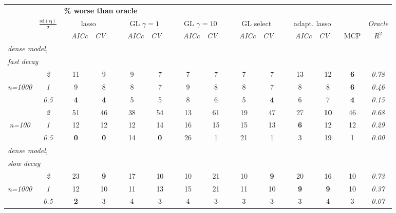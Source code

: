 \documentclass[12pt]{article}
\begin{document}
\begin{table}
\footnotesize
\begin{center}
\begin{tabular}{cc|cc|cc|cc|cc|cc|c|c}
& & \multicolumn{11}{l|}{\bf \% worse than oracle } & \\[1ex]
& \multirow{2}{*}{$\displaystyle\frac{\mathrm{sd}(\boldsymbol{\eta})}{\sigma}$} 
& \multicolumn{2}{c}{lasso} 
& \multicolumn{2}{c}{GL $\gamma=1$} 
& \multicolumn{2}{c}{GL $\gamma=10$} 
& \multicolumn{2}{c}{GL select} 
& \multicolumn{2}{c}{ adapt. lasso} 
& \multicolumn{1}{c|}{~} & \it Oracle \\[-0.5ex]
& 
& ~~\scriptsize\it AICc & \multicolumn{1}{c}{\scriptsize\it CV~~}
& ~~\scriptsize\it AICc & \multicolumn{1}{c}{\scriptsize\it CV~~}
& ~~\scriptsize\it AICc & \multicolumn{1}{c}{\scriptsize\it CV~~}
& ~~\scriptsize\it AICc & \multicolumn{1}{c}{\scriptsize\it CV~~}
& ~~\scriptsize\it AICc & \multicolumn{1}{c}{\scriptsize\it CV~~} 
& \multicolumn{1}{c|}{ MCP} & $R^2$ \\[1ex]
\hline
\multicolumn{2}{l|}{\it dense model,} &&&&&&&&&&&\\
\multicolumn{2}{l|}{\it fast decay} &&&&&&&&&&&\\& \it  2  & 11 & 9 & 9 & 7 & 7 & 7 & 7 & 7 & 13 & 12 & {\bf 6} & \it  0.78 \\
\it n=1000  & \it  1  & 9 & 8 & 8 & 7 & 9 & 8 & 8 & 7 & 8 & 8 & {\bf 6} & \it  0.46 \\
& \it  0.5  & {\bf 4} & {\bf 4} & 5 & 5 & 8 & 6 & 5 & {\bf 4} & 6 & 7 & {\bf 4} & \it  0.15 \\[1ex]
\cline{2-2}\rule{0pt}{3ex}& \it  2  & 51 & 46 & 38 & 54 & 13 & 61 & 19 & 47 & 27 & {\bf 10} & 46 & \it  0.68 \\
\it n=100  & \it  1  & 12 & 12 & 12 & 14 & 16 & 15 & 15 & 13 & {\bf 6} & 12 & 12 & \it  0.29 \\
& \it  0.5  & {\bf 0} & {\bf 0} & 14 & {\bf 0} & 26 & 1 & 21 & 1 & 3 & 19 & 1 & \it  0.00 \\[1ex]
\hline\multicolumn{2}{l|}{\it dense model,} &&&&&&&&&&&\\
\multicolumn{2}{l|}{\it slow decay} &&&&&&&&&&&\\& \it  2  & 23 & {\bf 9} & 17 & 10 & 10 & 21 & 10 & {\bf 9} & 20 & 16 & 10 & \it  0.73 \\
\it n=1000  & \it  1  & 12 & 10 & 11 & 13 & 15 & 21 & 11 & 10 & {\bf 9} & {\bf 9} & 10 & \it  0.37 \\
& \it  0.5  & {\bf 2} & 3 & 4 & 3 & 4 & 3 & 3 & 3 & 3 & 4 & 3 & \it  0.07 \\[1ex]

\end{tabular}
\end{center}
\end{table}
\end{document}
